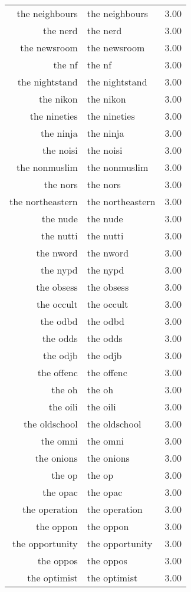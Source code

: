 \begin{table}[ht]
\begin{tabular}{rlr}
  the neighbours & the neighbours & 3.00 \\ 
  the nerd & the nerd & 3.00 \\ 
  the newsroom & the newsroom & 3.00 \\ 
  the nf & the nf & 3.00 \\ 
  the nightstand & the nightstand & 3.00 \\ 
  the nikon & the nikon & 3.00 \\ 
  the nineties & the nineties & 3.00 \\ 
  the ninja & the ninja & 3.00 \\ 
  the noisi & the noisi & 3.00 \\ 
  the nonmuslim & the nonmuslim & 3.00 \\ 
  the nors & the nors & 3.00 \\ 
  the northeastern & the northeastern & 3.00 \\ 
  the nude & the nude & 3.00 \\ 
  the nutti & the nutti & 3.00 \\ 
  the nword & the nword & 3.00 \\ 
  the nypd & the nypd & 3.00 \\ 
  the obsess & the obsess & 3.00 \\ 
  the occult & the occult & 3.00 \\ 
  the odbd & the odbd & 3.00 \\ 
  the odds & the odds & 3.00 \\ 
  the odjb & the odjb & 3.00 \\ 
  the offenc & the offenc & 3.00 \\ 
  the oh & the oh & 3.00 \\ 
  the oili & the oili & 3.00 \\ 
  the oldschool & the oldschool & 3.00 \\ 
  the omni & the omni & 3.00 \\ 
  the onions & the onions & 3.00 \\ 
  the op & the op & 3.00 \\ 
  the opac & the opac & 3.00 \\ 
  the operation & the operation & 3.00 \\ 
  the oppon & the oppon & 3.00 \\ 
  the opportunity & the opportunity & 3.00 \\ 
  the oppos & the oppos & 3.00 \\ 
  the optimist & the optimist & 3.00 \\ 

\end{tabular}
\end{table}
